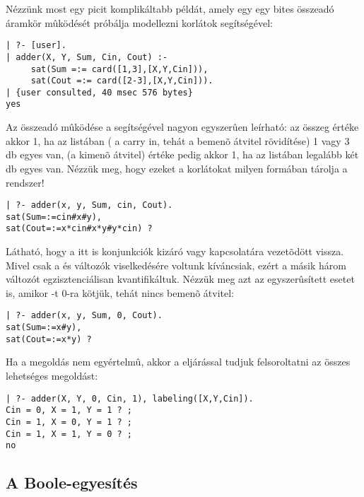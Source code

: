 Nézzünk most egy picit komplikáltabb \clpb példát, amely egy egy bites
összeadó áramkör mûködését próbálja modellezni \clpb korlátok segítségével:

\begin{verbatim}
| ?- [user].
| adder(X, Y, Sum, Cin, Cout) :-
     sat(Sum =:= card([1,3],[X,Y,Cin])),
     sat(Cout =:= card([2-3],[X,Y,Cin])).
| {user consulted, 40 msec 576 bytes}
yes
\end{verbatim}

Az összeadó mûködése a  segítségével nagyon egyszerûen leírható:
az összeg értéke akkor 1, ha az \cd{[X,Y,Cin]} listában ( a carry in,
tehát a bemenõ átvitel rövidítése) 1 vagy 3 db egyes van, 
(a kimenõ átvitel) értéke pedig akkor 1, ha az \cd{[X,Y,Cin]} listában legalább
két db egyes van. Nézzük meg, hogy ezeket a korlátokat milyen formában tárolja
a \clpb rendszer!

\begin{verbatim}
| ?- adder(x, y, Sum, cin, Cout).
sat(Sum=:=cin#x#y),
sat(Cout=:=x*cin#x*y#y*cin) ?
\end{verbatim}

Látható, hogy a  itt is konjunkciók kizáró vagy kapcsolatára
vezetõdött vissza. Mivel csak a  és  változók viselkedésére
voltunk kíváncsiak, ezért a másik három változót egzisztenciálisan
kvantifikáltuk. Nézzük meg azt az egyszerûsített esetet is, amikor -t
0-ra kötjük, tehát nincs bemenõ átvitel:

\begin{verbatim}
| ?- adder(x, y, Sum, 0, Cout).
sat(Sum=:=x#y),
sat(Cout=:=x*y) ?
\end{verbatim}

Ha a megoldás nem egyértelmû, akkor a  eljárással tudjuk
felsoroltatni az összes lehetséges megoldást:

\begin{verbatim}
| ?- adder(X, Y, 0, Cin, 1), labeling([X,Y,Cin]).
Cin = 0, X = 1, Y = 1 ? ; 
Cin = 1, X = 0, Y = 1 ? ;
Cin = 1, X = 1, Y = 0 ? ;
no
\end{verbatim}

\subsection{A Boole-egyesítés}

